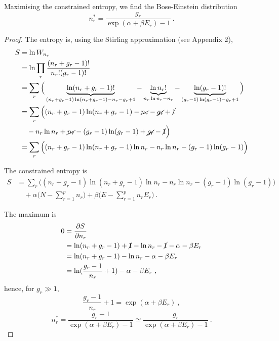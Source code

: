     Maximising the constrained entropy, we find the Bose-Einstein distribution 
    \begin{equation*}
        n_r^* = \frac{g_r}{\exp(\alpha + \beta E_r) - 1} ~.
    \end{equation*}
    \begin{proof}
        The entropy is, using the Stirling approximation (see Appendix 2),
        \begin{equation*}
        \begin{aligned}
            S & = \ln W_{n_r} \\ & = \ln \prod_r \frac{(n_r + g_r - 1)!}{n_r! (g_r - 1)!} \\ & = \sum_r \Big (\underbrace{\ln (n_r + g_r - 1)!}_{(n_r + g_r - 1) \ln (n_r + g_r - 1) - n_r - g_r + 1} - \underbrace{\ln n_r!}_{n_r \ln n_r - n_r} - \underbrace{\ln (g_r - 1)!}_{(g_r - 1) \ln (g_r - 1) - g_r + 1} \Big ) \\ & = \sum_r \Big ( (n_r + g_r - 1) \ln (n_r + g_r - 1) - \cancel{n_r} - \cancel{g_r} + \cancel{1} \\ & \quad - n_r \ln n_r + \cancel{n_r }- (g_r - 1) \ln (g_r - 1) + \cancel{g_r} - \cancel{1} \Big ) \\ & = \sum_r \Big ( (n_r + g_r - 1) \ln (n_r + g_r - 1) \ln n_r - n_r \ln n_r - (g_r - 1) \ln (g_r - 1) \Big ) 
        \end{aligned}
        \end{equation*}
    
        The constrained entropy is
        \begin{equation*}
        \begin{aligned}
            S & = \sum_r \Big ( (n_r + g_r - 1) \ln (n_r + g_r - 1) \ln n_r - n_r \ln n_r - (g_r - 1) \ln (g_r - 1) \Big ) \\ & \quad + \alpha \Big (N - \sum_{r=1}^p n_r \Big) + \beta \Big (E - \sum_{r=1}^p n_r E_r \Big ) ~.
        \end{aligned}
        \end{equation*}
    
        The maximum is 
        \begin{equation*}
        \begin{aligned}
            0 & = \frac{\partial S}{\partial n_r} \\ & = \ln (n_r + g_r - 1) + \cancel{1} - \ln n_r - \cancel{1} - \alpha - \beta E_r \\ & = \ln (n_r + g_r - 1) - \ln n_r - \alpha - \beta E_r \\ & = \ln (\frac{g_r - 1}{n_r} + 1) - \alpha - \beta E_r~ ,
        \end{aligned}
        \end{equation*}
        hence, for $g_r \gg 1$,
        \begin{equation*}
            \frac{g_r - 1}{n_r} + 1 = \exp(\alpha + \beta E_r) ~,
        \end{equation*}
        \begin{equation*}
            n_r^* = \frac{g_r - 1}{\exp(\alpha + \beta E_r) - 1} \simeq \frac{g_r}{\exp(\alpha + \beta E_r) - 1} ~.
        \end{equation*}
    \end{proof}
